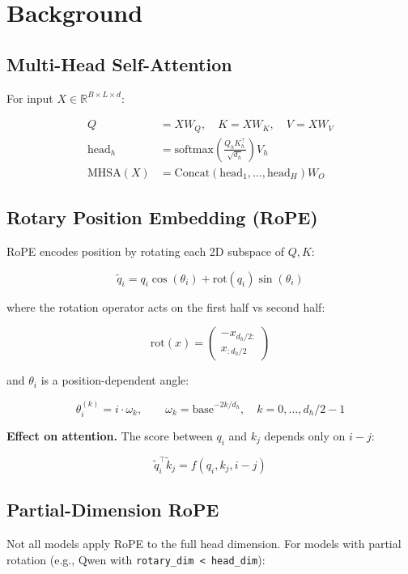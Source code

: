 
\section{Background}

\subsection{Multi-Head Self-Attention}

For input $X \in \mathbb{R}^{B \times L \times d}$:

\[
\begin{aligned}
Q &= X W_Q, \quad K = X W_K, \quad V = X W_V \\
\text{head}_h &= \mathrm{softmax}\!\left(\frac{Q_h K_h^\top}{\sqrt{d_h}}\right) V_h \\
\text{MHSA}(X) &= \mathrm{Concat}(\text{head}_1, \dots, \text{head}_H) W_O
\end{aligned}
\tag{3.1}
\]

\subsection{Rotary Position Embedding (RoPE)}

RoPE encodes position by rotating each 2D subspace of $Q, K$:

\[
\tilde{q}_i = q_i \cos(\theta_i) + \mathrm{rot}(q_i) \sin(\theta_i)
\tag{3.2}
\]

where the rotation operator acts on the first half vs second half:

\[
\mathrm{rot}(x) = \begin{pmatrix} -x_{d_h/2:} \\ x_{:d_h/2} \end{pmatrix}
\tag{3.3}
\]

and $\theta_i$ is a position-dependent angle:

\[
\theta_i^{(k)} = i \cdot \omega_k, \qquad
\omega_k = \mathrm{base}^{-2k/d_h}, \quad k = 0, \dots, d_h/2 - 1
\tag{3.4}
\]

\textbf{Effect on attention.} The score between $q_i$ and $k_j$ depends only on 
$i - j$:

\[
\tilde{q}_i^\top \tilde{k}_j = f(q_i, k_j, i - j)
\tag{3.5}
\]

\subsection{Partial-Dimension RoPE}

Not all models apply RoPE to the full head dimension. For models with 
partial rotation (e.g., Qwen with \texttt{rotary\_dim < head\_dim}):

